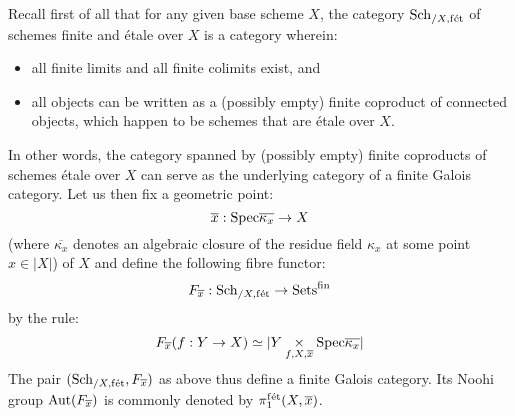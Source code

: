                 \begin{definition} \label{def: etale_fundamental_groups}
                    Recall first of all that for any given base scheme $X$, the category $\mathrm{Sch}_{/X, \mathrm{f\acute{e}t}}$ of schemes finite and \'etale over $X$ is a category wherein:
                        \begin{itemize}
                            \item all finite limits and all finite colimits exist, and
                            \item all objects can be written as a (possibly empty) finite coproduct of connected objects, which happen to be schemes that are \'etale over $X$.  
                        \end{itemize}
                    In other words, the category spanned by (possibly empty) finite coproducts of schemes \'etale over $X$ can serve as the underlying category of a finite Galois category. Let us then fix a geometric point:
                        $$\overline{x}: \mathrm{Spec} \overline{\kappa_x} \to X$$
                    (where $\overline{\kappa_x}$ denotes an algebraic closure of the residue field $\kappa_x$ at some point $x \in |X|$) of $X$ and define the following fibre functor:
                        $$F_{\overline{x}}: \mathrm{Sch}_{/X, \mathrm{f\acute{e}t}} \to \mathrm{Sets}^{\mathrm{fin}}$$
                    by the rule:
                        $$F_{\overline{x}}(f: Y \to X) \cong |Y \x_{f, X, \overline{x}} \Spec \overline{\kappa_x}|$$
                    The pair $(\mathrm{Sch}_{/X, \mathrm{f\acute{e}t}}, F_{\overline{x}})$ as above thus define a finite Galois category. Its Noohi group $\mathrm{Aut}(F_{\overline{x}})$ is commonly denoted by $\pi_1^{\mathrm{f\acute{e}t}}(X, \overline{x})$.
                \end{definition}

